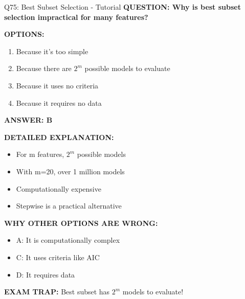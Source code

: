 \documentclass[8pt]{beamer}
\begin{document}
	\begin{frame}{Q75: Best Subset Selection - Tutorial}
		\fontsize{6.5}{7.5}\selectfont
		\textbf{QUESTION: Why is best subset selection impractical for many features?}
		
		\vspace{0.1cm}
		\textbf{OPTIONS:}
		\begin{enumerate}
			\item Because it's too simple
			\item Because there are $2^m$ possible models to evaluate
			\item Because it uses no criteria
			\item Because it requires no data
		\end{enumerate}
		
		\vspace{0.1cm}
		\textcolor{myblue}{\textbf{ANSWER: B}}
		
		\vspace{0.1cm}
		\textbf{DETAILED EXPLANATION:}
		\begin{itemize}
			\item For m features, $2^m$ possible models
			\item With m=20, over 1 million models
			\item Computationally expensive
			\item Stepwise is a practical alternative
		\end{itemize}
		
		\vspace{0.1cm}
		\textcolor{myred}{\textbf{WHY OTHER OPTIONS ARE WRONG:}}
		\begin{itemize}
			\item \textcolor{myred}{A:} It is computationally complex
			\item \textcolor{myred}{C:} It uses criteria like AIC
			\item \textcolor{myred}{D:} It requires data
		\end{itemize}
		
		\textcolor{myred}{\textbf{EXAM TRAP:}} Best subset has \textcolor{myblue}{$2^m$ models} to evaluate!
	\end{frame}
	
\end{document}
